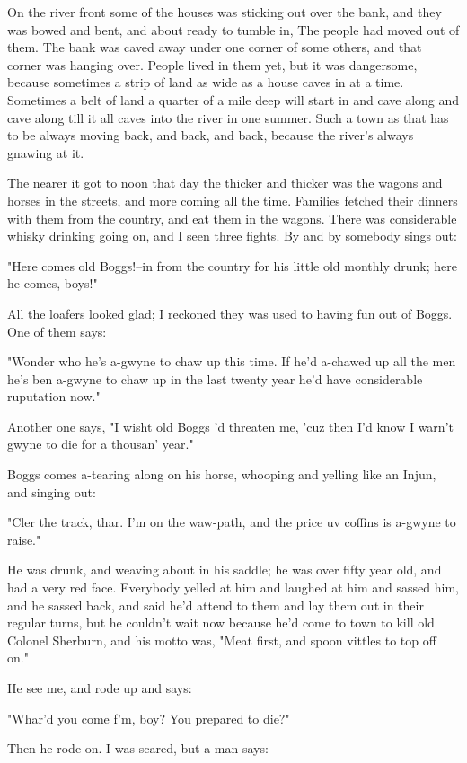 On the river front some of the houses was sticking out over the bank, and
they was bowed and bent, and about ready to tumble in, The people had
moved out of them.  The bank was caved away under one corner of some
others, and that corner was hanging over.  People lived in them yet, but
it was dangersome, because sometimes a strip of land as wide as a house
caves in at a time.  Sometimes a belt of land a quarter of a mile deep
will start in and cave along and cave along till it all caves into the
river in one summer. Such a town as that has to be always moving back,
and back, and back, because the river's always gnawing at it.

The nearer it got to noon that day the thicker and thicker was the wagons
and horses in the streets, and more coming all the time.  Families
fetched their dinners with them from the country, and eat them in the
wagons.  There was considerable whisky drinking going on, and I seen
three fights.  By and by somebody sings out:

"Here comes old Boggs!--in from the country for his little old monthly
drunk; here he comes, boys!"

All the loafers looked glad; I reckoned they was used to having fun out
of Boggs.  One of them says:

"Wonder who he's a-gwyne to chaw up this time.  If he'd a-chawed up all
the men he's ben a-gwyne to chaw up in the last twenty year he'd have
considerable ruputation now."

Another one says, "I wisht old Boggs 'd threaten me, 'cuz then I'd know I
warn't gwyne to die for a thousan' year."

Boggs comes a-tearing along on his horse, whooping and yelling like an
Injun, and singing out:

"Cler the track, thar.  I'm on the waw-path, and the price uv coffins is
a-gwyne to raise."

He was drunk, and weaving about in his saddle; he was over fifty year
old, and had a very red face.  Everybody yelled at him and laughed at him
and sassed him, and he sassed back, and said he'd attend to them and lay
them out in their regular turns, but he couldn't wait now because he'd
come to town to kill old Colonel Sherburn, and his motto was, "Meat
first, and spoon vittles to top off on."

He see me, and rode up and says:

"Whar'd you come f'm, boy?  You prepared to die?"

Then he rode on.  I was scared, but a man says:

